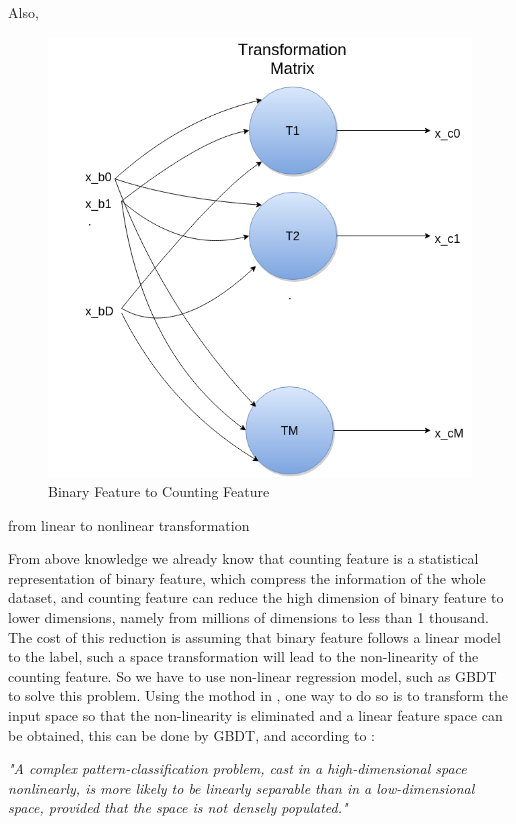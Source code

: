 Also, 
\begin{figure}[h]
\centering
\includegraphics[width=\columnwidth]{countingfeature.png}
\caption{Binary Feature to Counting Feature}
\label{fig:counting}
\end{figure}

from linear to nonlinear transformation 

From above knowledge we already know that counting feature is a statistical representation of binary feature, which compress the information of the whole dataset, and counting feature can reduce the high dimension of binary feature to lower dimensions, namely from millions of dimensions to less than 1 thousand. The cost of this reduction is assuming that binary feature follows a linear model to the label, such a space transformation will lead to the non-linearity of the counting feature. So we have to use non-linear regression model, such as GBDT to solve this problem. Using the mothod in \cite{he2014practical}, one way to do so is to transform the input space so that the non-linearity is eliminated and a linear feature space can be obtained, this can be done by GBDT, and according to \cite{cover1965geometrical}:

\textit{"A complex pattern-classification problem, cast in a high-dimensional space nonlinearly, is more likely to be linearly separable than in a low-dimensional space, provided that the space is not densely populated."}

